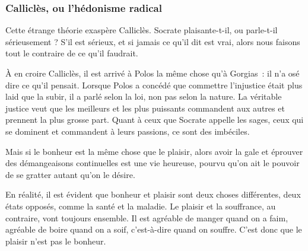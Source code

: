\documentclass[fontsize=26pt,a4paper]{scrartcl}
\begin{document}
\subsubsection*{Calliclès, ou l'hédonisme radical}

Cette étrange théorie exaspère Calliclès. Socrate plaisante-t-il, ou parle-t-il sérieusement ? S'il est sérieux, et si jamais ce qu'il dit est vrai, alors nous faisons tout le contraire de ce qu'il faudrait.

À en croire Calliclès, il est arrivé à Polos la même chose qu'à Gorgias~: il n'a osé dire ce qu'il pensait. Lorsque Polos a concédé que commettre l'injustice était plus laid que la subir, il a parlé selon la loi, non pas selon la nature. La véritable justice veut que les meilleurs et les plus puissants commandent aux autres et prennent la plus grosse part. Quant à ceux que Socrate appelle les sages, ceux qui se dominent et commandent à leurs passions, ce sont des imbéciles.%

Mais si le bonheur est la même chose que le plaisir, alors avoir la gale et éprouver des démangeaisons continuelles est une vie heureuse, pourvu qu'on ait le pouvoir de se gratter autant qu'on le désire.%

En réalité, il est évident que bonheur et plaisir sont deux choses différentes, deux états opposés, comme la santé et la maladie. Le plaisir et la souffrance, au contraire, vont toujours ensemble. Il est agréable de manger quand on a faim, agréable de boire quand on a soif, c'est-à-dire quand on souffre. C'est donc que le plaisir n'est pas le bonheur.%
\end{document}
